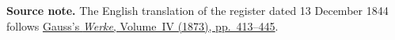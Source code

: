 \par\medskip\begin{small}\noindent\textbf{Source note.} The English translation of the register dated 13 December 1844 follows \href{https://gdz.sub.uni-goettingen.de/id/PPN236005081}{Gauss’s \textit{Werke}, Volume~IV (1873), pp.~413--445}.\par\end{small}
